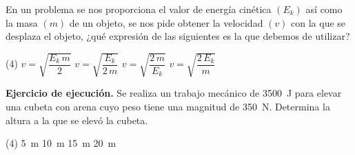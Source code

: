 \documentclass[12pt, letter]{exam}
\begin{document}
\begin{questions}
    \question En un problema se nos proporciona el valor de energía cinética $(E_{k})$ así como la masa $(m)$ de un objeto, se nos pide obtener la velocidad $(v)$ con la que se desplaza el objeto, ¿qué expresión de las siguientes es la que debemos de utilizar?
    \begin{tasks}(4)
        \task $v = \sqrt{\dfrac{E_{k} \, m}{2}}$
        \task $v = \sqrt{\dfrac{E_{k}}{2 \, m}}$
        \task $v = \sqrt{\dfrac{2 \, m}{E_{k}}}$
        \task $v = \sqrt{\dfrac{2 \, E_{k}}{m}}$
    \end{tasks}
    \question \label{Ejercicio_12} \textbf{Ejercicio de ejecución.} Se realiza un trabajo mecánico de \SI{3500}{\joule} para elevar una cubeta con arena cuyo peso tiene una magnitud de \SI{350}{\newton}. Determina la altura a la que se elevó la cubeta.
    \begin{tasks}(4)
        \task \SI{5}{\meter}
        \task \SI{10}{\meter}
        \task \SI{15}{\meter}
        \task \SI{20}{\meter}
    \end{tasks}
    

\end{questions}
\end{document}

